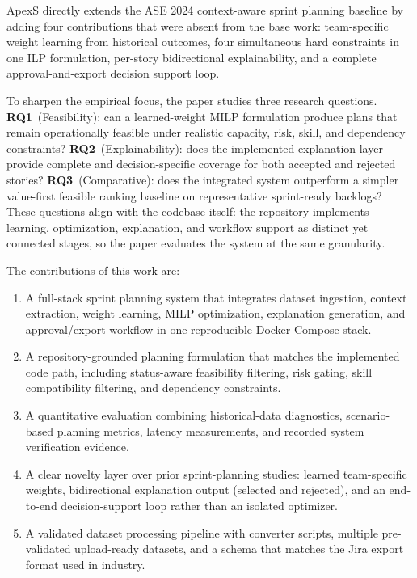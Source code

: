 \documentclass[conference]{IEEEtran}
\begin{document}
ApexS directly extends the ASE 2024 context-aware sprint planning baseline
\cite{ase2024} by adding four contributions that were absent from the base work:
team-specific weight learning from historical outcomes, four simultaneous hard
constraints in one ILP formulation, per-story bidirectional explainability, and a
complete approval-and-export decision support loop.

To sharpen the empirical focus, the paper studies three research questions.
\textbf{RQ1}~(Feasibility): can a learned-weight MILP formulation produce plans
that remain operationally feasible under realistic capacity, risk, skill, and
dependency constraints?
\textbf{RQ2}~(Explainability): does the implemented explanation layer provide
complete and decision-specific coverage for both accepted and rejected stories?
\textbf{RQ3}~(Comparative): does the integrated system outperform a simpler
value-first feasible ranking baseline on representative sprint-ready backlogs?
These questions align with the codebase itself: the repository implements learning,
optimization, explanation, and workflow support as distinct yet connected stages, so
the paper evaluates the system at the same granularity.

The contributions of this work are:
\begin{enumerate}[leftmargin=*,itemsep=1pt,topsep=2pt]
\item A full-stack sprint planning system that integrates dataset ingestion, context
      extraction, weight learning, MILP optimization, explanation generation, and
      approval/export workflow in one reproducible Docker Compose stack.
\item A repository-grounded planning formulation that matches the implemented code
      path, including status-aware feasibility filtering, risk gating, skill
      compatibility filtering, and dependency constraints.
\item A quantitative evaluation combining historical-data diagnostics,
      scenario-based planning metrics, latency measurements, and recorded system
      verification evidence.
\item A clear novelty layer over prior sprint-planning studies: learned
      team-specific weights, bidirectional explanation output (selected and
      rejected), and an end-to-end decision-support loop rather than an isolated
      optimizer.
\item A validated dataset processing pipeline with converter scripts, multiple
      pre-validated upload-ready datasets, and a schema that matches the Jira
      export format used in industry.
\end{enumerate}
\end{document}
